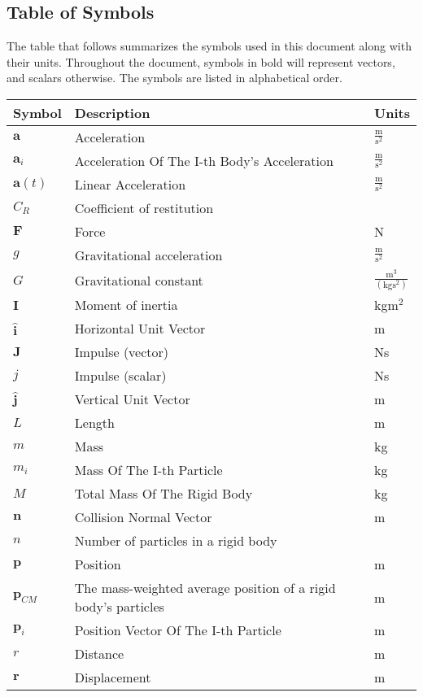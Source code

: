 \documentclass[12pt]{article}
\begin{document}
\subsection{Table of Symbols}
\label{Sec:TablofSymb}
The table that follows summarizes the symbols used in this document along with their units. Throughout the document, symbols in bold will represent vectors, and scalars otherwise. The symbols are listed in alphabetical order.
\begin{longtable*}{l l l}
\toprule
Symbol & Description & Units
\\
\midrule
$\mathbf{a}$ & Acceleration & $\frac{\text{m}}{\text{s}^{2}}$
\\
$\mathbf{a}_{i}$ & Acceleration Of The I-th Body's Acceleration & $\frac{\text{m}}{\text{s}^{2}}$
\\
$\mathbf{a}(t)$ & Linear Acceleration & $\frac{\text{m}}{\text{s}^{2}}$
\\
$C_{R}$ & Coefficient of restitution & 
\\
$\mathbf{F}$ & Force & N
\\
$g$ & Gravitational acceleration & $\frac{\text{m}}{\text{s}^{2}}$
\\
$G$ & Gravitational constant & $\frac{\text{m}^{3}}{(\text{kg}\text{s}^{2})}$
\\
$\mathbf{I}$ & Moment of inertia & kg$\text{m}^{2}$
\\
$\mathbf{\hat{i}}$ & Horizontal Unit Vector & m
\\
$\mathbf{J}$ & Impulse (vector) & Ns
\\
$j$ & Impulse (scalar) & Ns
\\
$\mathbf{\hat{j}}$ & Vertical Unit Vector & m
\\
$L$ & Length & m
\\
$m$ & Mass & kg
\\
$m_{i}$ & Mass Of The I-th Particle & kg
\\
$M$ & Total Mass Of The Rigid Body & kg
\\
$\mathbf{n}$ & Collision Normal Vector & m
\\
$n$ & Number of particles in a rigid body & 
\\
$\mathbf{p}$ & Position & m
\\
$\mathbf{p}_{CM}$ & The mass-weighted average position of a rigid body's particles & m
\\
$\mathbf{p}_{i}$ & Position Vector Of The I-th Particle & m
\\
$r$ & Distance & m
\\
$\mathbf{r}$ & Displacement & m

\end{longtable*}
\end{document}
